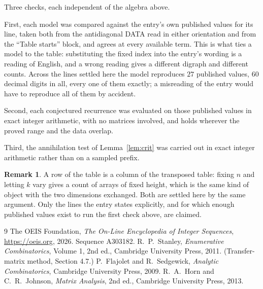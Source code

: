 \documentclass[11pt,a4paper]{article}
\theoremstyle{plain}
\theoremstyle{definition}
\newtheorem{remark}[theorem]{Remark}
\begin{document}
Three checks, each independent of the algebra above.

First, each model was compared against the entry's own published values for its line, taken
both from the antidiagonal DATA read in either orientation and from the ``Table starts''
block, and agrees at every available term. This is what ties a model to the table:
substituting the fixed index into the entry's wording is a reading of English, and a wrong
reading gives a different digraph and different counts. Across the lines settled here the
model reproduces $27$ published values, $60$ decimal digits in all, every one of
them exactly; a misreading of the entry would have to reproduce all of them by accident.

Second, each conjectured recurrence was evaluated on those published values in exact
integer arithmetic, with no matrices involved, and holds wherever the proved range and the
data overlap.

Third, the annihilation test of Lemma~\ref{lem:crit} was carried out in exact integer
arithmetic rather than on a sampled prefix.

\begin{remark}
A row of the table is a column of the transposed table: fixing $n$ and letting $k$ vary gives a
count of arrays of fixed height, which is the same kind of object with the two dimensions
exchanged. Both are settled here by the same argument. Only the lines the entry states
explicitly, and for which enough published values exist to run the first check above, are
claimed.
\end{remark}

\begin{thebibliography}{9}
 The OEIS Foundation, \emph{The On-Line Encyclopedia of Integer
Sequences}, \url{https://oeis.org}, 2026. Sequence A303182.
 R.~P.~Stanley, \emph{Enumerative Combinatorics}, Volume 1, 2nd ed.,
Cambridge University Press, 2011. (Transfer-matrix method, Section 4.7.)
 P.~Flajolet and R.~Sedgewick, \emph{Analytic Combinatorics}, Cambridge
University Press, 2009.
 R.~A.~Horn and C.~R.~Johnson, \emph{Matrix Analysis}, 2nd ed., Cambridge
University Press, 2013.
\end{thebibliography}
\end{document}

